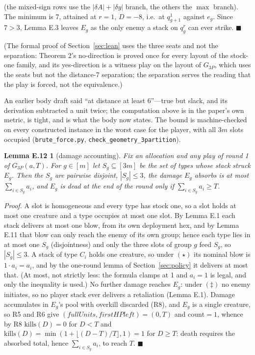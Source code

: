 \documentclass[11pt,a4paper]{article}
\theoremstyle{plain}
\newtheorem*{lemEacctwo}{Lemma E.12}
\theoremstyle{definition}
\theoremstyle{plain}
\theoremstyle{definition}
\theoremstyle{remark}
\newcommand{\src}[1]{\texttt{#1}}
\newcommand{\qedbox}{\hfill$\blacksquare$}
\begin{document}
\noindent(the mixed-sign rows use the $|\delta A|+|\delta y|$ branch, the others the
$\max$ branch). The minimum is 7, attained at $r=1$, $D=-8$, i.e.\ at $q_{g+1}^1$ against
$e_g$. Since $7>3$, Lemma E.3 leaves $E_g$ as the only enemy a stack on $q_g^r$ can ever
strike. \qedbox

\smallskip
\noindent(The formal proof of Section~\ref{sec:lean} uses the three seats and not the
separation: Theorem 2's no-direction is proved once for every layout of the stock-one family,
and its yes-direction is a witness play on the layout of $G_{3P}$, which uses the seats but
not the distance-7 separation; the separation serves the reading that the play is forced,
not the equivalence.)

\smallskip
An earlier body draft said ``at distance at least 6''---true but slack, and its derivation
subtracted a unit twice; the computation above is in the paper's own metric, is tight, and
is what the body now states. The bound is machine-checked on every constructed instance in the worst case for the player,
with all $3m$ slots occupied (\src{brute\_force.py}, \texttt{check\_geometry\_3partition}).

\begin{lemEacctwo}[damage accounting]\sloppy
Fix an allocation and any play of round 1 of $G_{3P}(a,T)$. For $g\in[m]$ let $S_g\subseteq[3m]$
be the set of types whose stack struck $E_g$. Then the $S_g$ are pairwise disjoint,
$|S_g|\le 3$, the damage $E_g$ absorbs is at most $\sum_{i\in S_g}a_i$, and $E_g$ is dead at
the end of the round only if $\sum_{i\in S_g}a_i\ge T$.
\end{lemEacctwo}

\noindent\emph{Proof.} A slot is homogeneous and every type has stock one, so a slot holds at
most one creature and a type occupies at most one slot. By Lemma E.1 each stack delivers at
most one blow, from its own deployment hex, and by Lemma E.11 that blow can only reach the
enemy of its own group; hence each type lies in at most one $S_g$ (disjointness) and only
the three slots of group $g$ feed $S_g$, so $|S_g|\le 3$. A stack of type $C_i$ holds one
creature, so under $(\star)$ its nominal blow is $1\cdot a_i=a_i$, and by the one-round lemma
of Section~\ref{sec:policy} it delivers at most that. (At most, not strictly less: the
formula clamps at 1 and $a_i=1$ is legal, and only the inequality is used.) No further damage
reaches $E_g$: under $(\ddagger)$ no enemy initiates, so no player stack ever delivers a
retaliation (Lemma E.1). Damage accumulates in $E_g$'s pool with overkill discarded (R8), and
$E_g$ is a single creature, so R5 and R6 give
$(\mathit{fullUnits},\mathit{firstHPleft})=(0,T)$ and $\mathrm{count}=1$, whence by R8
$\mathrm{kills}(D)=0$ for $D<T$ and $\mathrm{kills}(D)=\min(1+\lfloor(D-T)/T\rfloor,1)=1$
for $D\ge T$: death requires the absorbed total, hence $\sum_{i\in S_g}a_i$, to reach $T$.
\qedbox
\end{document}
